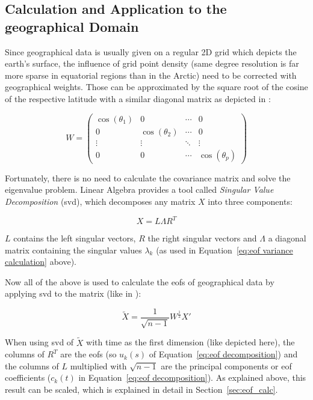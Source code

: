 \subsection{Calculation and Application to the geographical Domain}


Since geographical data is usually given on a regular 2D grid which depicts the earth's surface, the influence of grid point density (same degree resolution is far more sparse in equatorial regions than in the Arctic) need to be corrected with geographical weights. 
Those can be approximated by the square root of the cosine of the respective latitude \cite{hannachi_primer_nodate, vietinghoffdiss} with a similar diagonal matrix as depicted in \cite{hannachi_primer_nodate}: 

\begin{equation}
  W = \begin{pmatrix}
    \cos(\theta_1) & 0 & \cdots & 0 \\
0 & \cos(\theta_2) & \cdots & 0 \\
\vdots & \vdots & \ddots & \vdots \\
0 & 0 & \cdots & \cos(\theta_p)
\end{pmatrix}
  \label{eq:geographical weighting}
\end{equation}
  

Fortunately, there is no need to calculate the covariance matrix and solve the eigenvalue problem. 
Linear Algebra provides a tool called \textit{Singular Value Decomposition} (\ac{svd}), which decomposes any matrix $X$ into three components: 

\begin{equation}
  X = L \Lambda R^T 
  \label{eq:svd definition}
\end{equation}

$L$ contains the left singular vectors, $R$ the right singular vectors and $\Lambda$ a diagonal matrix containing the singular values $\lambda_k$ (as used in Equation~\ref{eq:eof variance calculation} above). 

Now all of the above is used to calculate the \acp{eof} of geographical data by applying \ac{svd} to the matrix (like in ): 

\begin{equation}
  \tilde{X} = \frac{1}{\sqrt{n - 1}} W^{\frac{1}{2}} X' 
  \label{eq:complete data preperation}
\end{equation}


When using \ac{svd} of $\tilde{X}$ with time as the first dimension (like depicted here), the columns of $R^T$ are the \acp{eof} (so $u_k(s)$ of Equation~\ref{eq:eof decomposition}) and the columns of $L$ multiplied with $\sqrt{n - 1}$ are the principal components or \ac{eof} coefficients ($c_k(t)$ in Equation~\ref{eq:eof decomposition}).
As explained above, this result can be scaled, which is explained in detail in Section~\ref{sec:eof_calc}.



